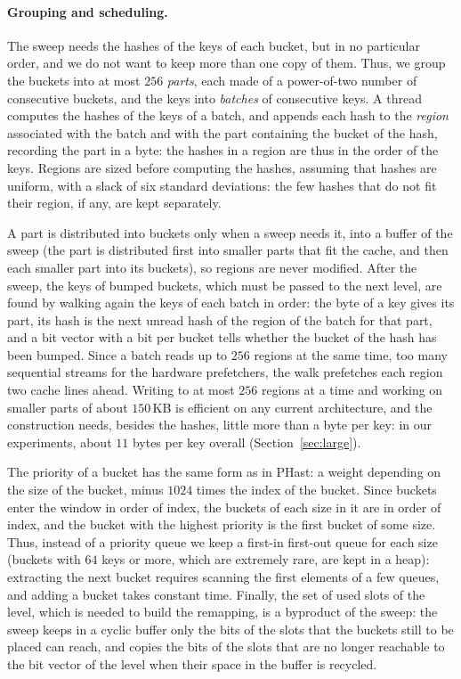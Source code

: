 \documentclass[11pt]{article}
\newcommand{\PHast}{PHast\xspace}
\begin{document}
\paragraph{Grouping and scheduling.}
The sweep needs the hashes of the keys of each bucket, but in no particular
order, and we do not want to keep more than one copy of them. Thus, we group
the buckets into at most $256$ \emph{parts}, each made of a power-of-two
number of consecutive buckets, and the keys into \emph{batches} of
consecutive keys. A thread computes the hashes of the keys of a batch, and
appends each hash to the \emph{region} associated with the batch and with the
part containing the bucket of the hash, recording the part in a byte: the
hashes in a region are thus in the order of the keys. Regions are sized
before computing the hashes, assuming that hashes are uniform, with a slack of
six standard deviations: the few hashes that do not fit their region, if any,
are kept separately.

A part is distributed into buckets only when a sweep needs it, into a buffer
of the sweep (the part is distributed first into smaller parts that fit the
cache, and then each smaller part into its buckets), so regions are never
modified. After the sweep, the keys of bumped buckets, which must be passed to
the next level, are found by walking again the keys of each batch in order:
the byte of a key gives its part, its hash is the next unread hash of the
region of the batch for that part, and a bit vector with a bit per bucket
tells whether the bucket of the hash has been bumped. Since a batch reads up
to $256$ regions at the same time, too many sequential streams for the
hardware prefetchers, the walk prefetches each region two cache lines ahead.
Writing to at most $256$
regions at a time and working on smaller parts of about $150$\,KB is
efficient on any current architecture, and the construction needs, besides
the hashes, little more than a byte per key: in our experiments, about $11$
bytes per key overall (Section~\ref{sec:large}).

The priority of a bucket has the same form as in \PHast: a weight depending
on the size of the bucket, minus $1024$ times the index of the bucket. Since buckets enter the window in
order of index, the buckets of each size in it are in order of index, and the
bucket with the highest priority is the first bucket of some size. Thus,
instead of a priority queue we keep a first-in first-out queue for each size
(buckets with $64$ keys or more, which are extremely rare, are kept in a
heap): extracting the next bucket
requires scanning the first elements of a few queues, and adding a bucket
takes constant time. Finally, the set of used slots of the level, which is
needed to build the remapping, is a byproduct of the sweep: the sweep keeps in a cyclic
buffer only the bits of the slots that the buckets still to be placed can
reach, and copies the bits of the slots that are no longer reachable to the
bit vector of the level when their space in the buffer is recycled.
\end{document}
